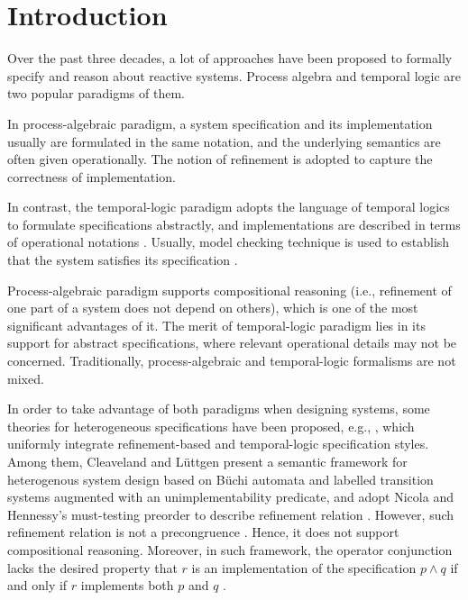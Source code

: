 \documentclass{elsarticle}
\theoremstyle{plain}
\theoremstyle{definition}
\begin{document}
\maketitle


\section{Introduction}

    Over the past three decades, a lot of approaches have been proposed to formally specify and reason about reactive systems. Process algebra \cite{Handbook} and temporal logic \cite{Pnueli} are two popular paradigms of them.

    In process-algebraic paradigm, a system specification and its implementation usually are formulated in the same notation, and the underlying semantics are often given operationally.
    The notion of refinement is adopted to capture the correctness of implementation.

    In contrast, the temporal-logic paradigm adopts the language of temporal logics to formulate specifications abstractly, and implementations are described in terms of operational notations \cite{Pnueli}.
    Usually, model checking technique is used to establish that the system satisfies its specification \cite{ModelChecking}.

    Process-algebraic paradigm supports compositional reasoning (i.e., refinement of one part of a system does not depend on others), which is one of the most significant advantages of it.
    The merit of temporal-logic paradigm lies in its support for  abstract specifications, where relevant operational details may not be concerned.
    Traditionally, process-algebraic and temporal-logic formalisms are not mixed.

    In order to take advantage of both paradigms when designing systems, some theories for heterogeneous specifications have been proposed, e.g., \cite{Cleaveland00, Cleaveland02, Graf86,Kurshan94,Olderog}, which uniformly integrate refinement-based and temporal-logic specification styles.
    Among them,  Cleaveland and L{\"u}ttgen present a semantic framework for heterogenous system design based on B{\"u}chi automata and labelled transition systems augmented with an unimplementability predicate, and adopt Nicola and Hennessy's must-testing preorder \cite{Nicola83} to describe refinement relation \cite{Cleaveland00, Cleaveland02}.
    However, such refinement relation is not a precongruence \cite{Cleaveland00}.
    Hence, it does not support compositional reasoning.
    Moreover, in such framework, the operator conjunction lacks the desired property that $r$ is an implementation of the specification $p \wedge q$ if and only if $r$ implements both $p$ and $q$ \cite{Cleaveland02}.
\end{document}
